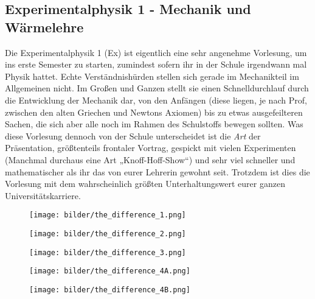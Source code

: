 \subsection{Experimentalphysik 1 - Mechanik und Wärmelehre}
\label{ex1}
Die Experimentalphysik 1 (\gls{Ex}) ist eigentlich eine sehr angenehme Vorlesung, um ins erste Semester zu starten, zumindest sofern ihr in der Schule irgendwann mal Physik hattet. Echte Verständnishürden stellen sich gerade im Mechanikteil im Allgemeinen nicht. Im Großen und Ganzen stellt sie einen Schnelldurchlauf durch die Entwicklung der Mechanik dar, von den Anfängen (diese liegen, je nach Prof, zwischen den alten Griechen und Newtons Axiomen) bis zu etwas ausgefeilteren Sachen, die sich aber alle noch im Rahmen des Schulstoffs bewegen sollten. Was diese Vorlesung dennoch von der Schule unterscheidet ist die \emph{Art} der Präsentation, größtenteils frontaler Vortrag, gespickt mit vielen Experimenten (Manchmal durchaus eine Art „Knoff-Hoff-Show“) und sehr viel schneller und mathematischer als ihr das von eurer Lehrerin gewohnt seit. Trotzdem ist dies die Vorlesung mit dem wahrscheinlich größten Unterhaltungswert eurer ganzen Universitätskarriere.

\begin{figure*}[b]
    \centering
    \begin{subfigure}[b]{.18\textwidth}
    \texttt{[image: bilder/the\_difference\_1.png]}	    
    \end{subfigure}
    \begin{subfigure}[b]{.18\textwidth}
    \texttt{[image: bilder/the\_difference\_2.png]}
    \end{subfigure}
    \begin{subfigure}[b]{.18\textwidth}
    \texttt{[image: bilder/the\_difference\_3.png]}
    \end{subfigure}
    \begin{subfigure}[b]{.18\textwidth}
    \texttt{[image: bilder/the\_difference\_4A.png]}
    \end{subfigure}
    \begin{subfigure}[b]{.18\textwidth}
    \texttt{[image: bilder/the\_difference\_4B.png]}
    \end{subfigure}
\end{figure*}

